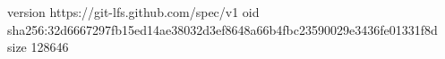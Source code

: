 version https://git-lfs.github.com/spec/v1
oid sha256:32d6667297fb15ed14ae38032d3ef8648a66b4fbc23590029e3436fe01331f8d
size 128646
